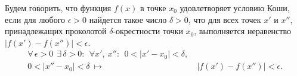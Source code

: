 
\begin{definition}
Будем говорить, что функция \(f(x)\) в точке \(x_{0}\) удовлетворяет условию Коши,
если для любого \(\epsilon > 0\) найдется такое число \(\delta > 0\), что для всех точек
\(x'\) и \(x''\), принадлежащих проколотой \(\delta\)-окрестности точки \(x_{0}\),
выполняется неравенство \(|f(x') - f(x'')| < \epsilon\).
\[
\begin{aligned}
\forall \, \epsilon > 0 ~~ \exists \, \delta > 0 : ~~ \forall x', ~ x'':
~~ 0 < |x' - x_{0}| < \delta,\\
0 < |x'' - x_{0}| < \delta ~ \longmapsto& ~ |f(x') - f(x'')| < \epsilon.
\end{aligned}
\]
\end{definition}

